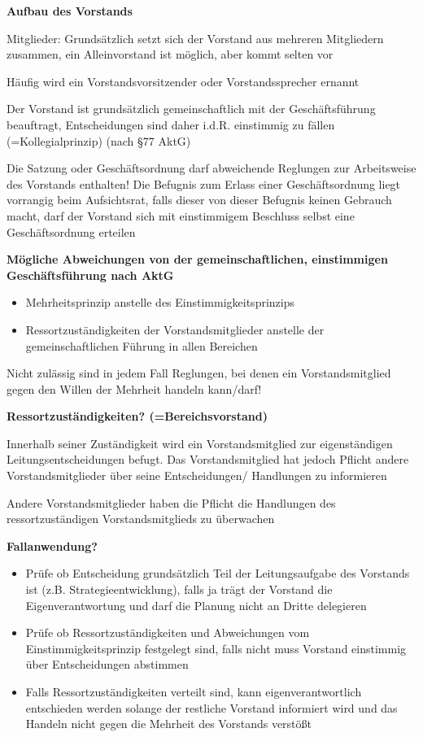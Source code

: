 \documentclass[
]{article}
\providecommand{\tightlist}{%
  \setlength{\itemsep}{0pt}\setlength{\parskip}{0pt}}
\begin{document}
\textbf{Aufbau des Vorstands}

Mitglieder: Grundsätzlich setzt sich der Vorstand aus mehreren
Mitgliedern zusammen, ein Alleinvorstand ist möglich, aber kommt selten
vor

Häufig wird ein Vorstandsvorsitzender oder Vorstandssprecher ernannt

Der Vorstand ist grundsätzlich gemeinschaftlich mit der Geschäftsführung
beauftragt, Entscheidungen sind daher i.d.R. einstimmig zu fällen
(=Kollegialprinzip) (nach §77 AktG)

Die Satzung oder Geschäftsordnung darf abweichende Reglungen zur
Arbeitsweise des Vorstands enthalten! Die Befugnis zum Erlass einer
Geschäftsordnung liegt vorrangig beim Aufsichtsrat, falls dieser von
dieser Befugnis keinen Gebrauch macht, darf der Vorstand sich mit
einstimmigem Beschluss selbst eine Geschäftsordnung erteilen

\textbf{Mögliche Abweichungen von der gemeinschaftlichen, einstimmigen
Geschäftsführung nach AktG}

\begin{itemize}
\tightlist
\item
  Mehrheitsprinzip anstelle des Einstimmigkeitsprinzips
\item
  Ressortzuständigkeiten der Vorstandsmitglieder anstelle der
  gemeinschaftlichen Führung in allen Bereichen
\end{itemize}

Nicht zulässig sind in jedem Fall Reglungen, bei denen ein
Vorstandsmitglied gegen den Willen der Mehrheit handeln kann/darf!

\textbf{Ressortzuständigkeiten? (=Bereichsvorstand)}

Innerhalb seiner Zuständigkeit wird ein Vorstandsmitglied zur
eigenständigen Leitungsentscheidungen befugt. Das Vorstandsmitglied hat
jedoch Pflicht andere Vorstandsmitglieder über seine Entscheidungen/
Handlungen zu informieren

Andere Vorstandsmitglieder haben die Pflicht die Handlungen des
ressortzuständigen Vorstandsmitglieds zu überwachen

\textbf{Fallanwendung?}

\begin{itemize}
\tightlist
\item
  Prüfe ob Entscheidung grundsätzlich Teil der Leitungsaufgabe des
  Vorstands ist (z.B. Strategieentwicklung), falls ja trägt der Vorstand
  die Eigenverantwortung und darf die Planung nicht an Dritte delegieren
\item
  Prüfe ob Ressortzuständigkeiten und Abweichungen vom
  Einstimmigkeitsprinzip festgelegt sind, falls nicht muss Vorstand
  einstimmig über Entscheidungen abstimmen
\item
  Falls Ressortzuständigkeiten verteilt sind, kann eigenverantwortlich
  entschieden werden solange der restliche Vorstand informiert wird und
  das Handeln nicht gegen die Mehrheit des Vorstands verstößt
\end{itemize}
\end{document}
